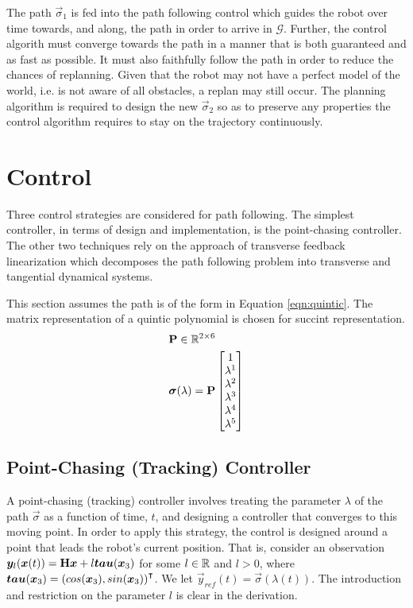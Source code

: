 \documentclass[oneside, 11pt]{book}
\begin{document}
The path $\vec{\sigma}_1$ is fed into the path following control which guides the robot over time towards, and along, the path in order to arrive in $\mathcal{G}$. Further, the control algorith must converge towards the path in a manner that is both guaranteed and as fast as possible. It must also faithfully follow the path in order to reduce the chances of replanning. Given that the robot may not have a perfect model of the world, i.e. is not aware of all obstacles, a replan may still occur. The planning algorithm is required to design the new $\vec{\sigma}_2$ so as to preserve any properties the control algorithm requires to stay on the trajectory continuously.

\chapter{Control}\label{sec:control}
Three control strategies are considered for path following. The simplest controller, in terms of design and implementation, is the point-chasing controller. The other two techniques rely on the approach of transverse feedback linearization which decomposes the path following problem into transverse and tangential dynamical systems.

This section assumes the path is of the form in Equation \ref{eqn:quintic}. The matrix representation of a quintic polynomial is chosen for succint representation.
\begin{align}
    &\mathbf{P}\in\mathbb{R}^{2\times6} \nonumber \\
    &\bm{\sigma}(\lambda) =    \mathbf{P}
                                \begin{bmatrix}
                                    1 \\
                                    \lambda^1 \\
                                    \lambda^2 \\
                                    \lambda^3 \\
                                    \lambda^4 \\
                                    \lambda^5
                                \end{bmatrix}
    \label{eqn:quintic}
\end{align}

\section{Point-Chasing (Tracking) Controller}
A point-chasing (tracking) controller involves treating the parameter $\lambda$ of the path $\vec{\sigma}$ as a function of time, $t$, and designing a controller that converges to this moving point. In order to apply this strategy, the control is designed around a point that leads the robot's current position. That is, consider an observation $\bm{y}_l(\bm{x}(t)) = \mathbf{H}\bm{x} + l\bm{tau}(\bm{x}_3)$ for some $l\in\mathbb{R}$ and $l > 0$, where $\bm{tau}(\bm{x}_3)={(cos(\bm{x}_3),sin(\bm{x}_3))}^{\intercal}$. We let $\vec{y}_{ref}(t) = \vec{\sigma}\left(\lambda(t)\right)$. The introduction and restriction on the parameter $l$ is clear in the derivation.
\end{document}

